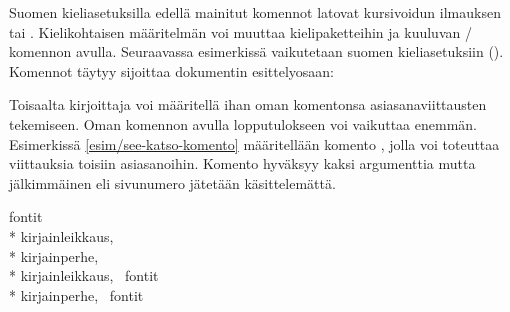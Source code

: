 Suomen kieliasetuksilla edellä mainitut komennot latovat kursivoidun
ilmauksen \textit{\seename} tai \textit{\alsoname}. Kielikohtaisen
määritelmän voi muuttaa kielipaketteihin  ja
 kuuluvan \-/ komennon avulla. Seuraavassa
esimerkissä vaikutetaan suomen kieliasetuksiin
(). Komennot täytyy sijoittaa dokumentin
esittelyosaan:

\begin{koodilohkosis}
\addto{\captionsfinnish}{
  \renewcommand{\seename}{katso}
  \renewcommand{\alsoname}{katso myös}
}
\end{koodilohkosis}

\noindent
Toisaalta kirjoittaja voi määritellä ihan oman komentonsa
asiasanaviittausten tekemiseen. Oman komennon avulla lopputulokseen voi
vaikuttaa enemmän. Esimerkissä \ref{esim/see-katso-komento} määritellään
komento , jolla voi toteuttaa viittauksia toisiin
asiasanoihin. Komento hyväksyy kaksi argumenttia mutta jälkimmäinen eli
sivunumero jätetään käsittelemättä.

\begin{esimerkki*}

\begin{koodilohko}
\newcommand{\katso}[2]{\textrightarrow\ #1}


\end{koodilohko}

\begin{tulos}
  fontit \\*
  \makebox[\sisennys]{}kirjainleikkaus,  \\*
  \makebox[\sisennys]{}kirjainperhe,  \\*
  kirjainleikkaus, \textrightarrow\ fontit \\*
  kirjainperhe, \textrightarrow\ fontit
\end{tulos}

\caption{Oman \-/ komennon määrittely. Komennon nimeä
  käytetään \-/ komennon argumentissa ja sillä viitataan
  toisiin asiasanoihin}
\label{esim/see-katso-komento}
\end{esimerkki*}

